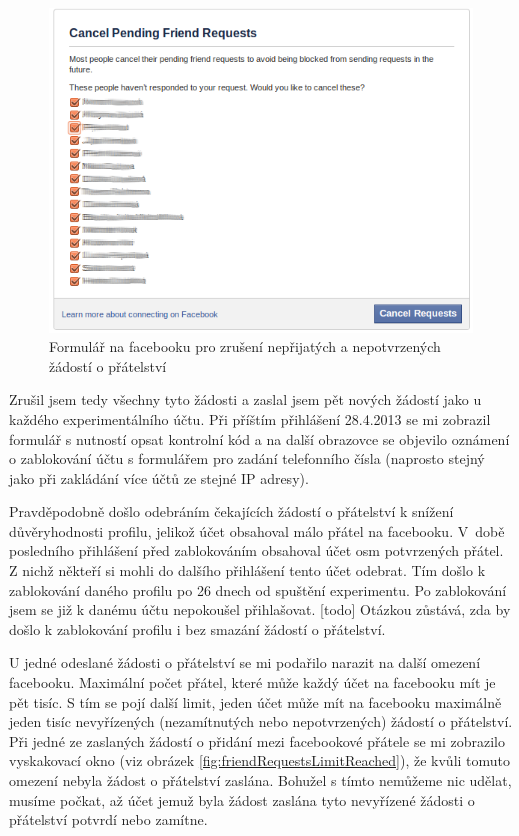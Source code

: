 \documentclass[thesis=M,czech]{FITthesis}[2013/05/10]
\begin{document}
\begin{figure}[h]
\begin{center}
\includegraphics[width=5in]{figures/cancelPendingFriendRequests.png}
\caption{Formulář na facebooku pro zrušení nepřijatých  a nepotvrzených žádostí o přátelství}
\label{fig:cancelPendingFrinedRequests}
\end{center}
\end{figure}

Zrušil jsem tedy všechny tyto žádosti a zaslal jsem pět nových žádostí jako u každého experimentálního účtu. Při příštím přihlášení 28.4.2013 se mi zobrazil formulář s nutností opsat kontrolní kód a na další obrazovce se objevilo oznámení o zablokování účtu s formulářem pro zadání telefonního čísla (naprosto stejný jako při zakládání více účtů ze stejné IP adresy).

Pravděpodobně došlo odebráním čekajících žádostí o přátelství k snížení důvěryhodnosti profilu, jelikož účet obsahoval málo přátel na facebooku. V~době posledního přihlášení před zablokováním obsahoval účet osm potvrzených přátel. Z nichž někteří si mohli do dalšího přihlášení tento účet odebrat. Tím došlo k zablokování daného profilu po 26 dnech od spuštění experimentu. Po zablokování jsem se již k danému účtu nepokoušel přihlašovat. [todo] Otázkou zůstává, zda by došlo k zablokování profilu i bez smazání žádostí o přátelství.

U jedné odeslané žádosti o přátelství se mi podařilo narazit na další omezení facebooku. Maximální počet přátel, které může každý účet na facebooku mít je pět tisíc. S tím se pojí další limit, jeden účet může mít na facebooku maximálně jeden tisíc nevyřízených (nezamítnutých nebo nepotvrzených) žádostí o přátelství. Při jedné ze zaslaných žádostí o přidání mezi facebookové přátele se mi zobrazilo vyskakovací okno (viz obrázek \ref{fig:friendRequestsLimitReached}), že kvůli tomuto omezení nebyla žádost o přátelství zaslána. Bohužel s tímto nemůžeme nic udělat, musíme počkat, až účet jemuž byla žádost zaslána tyto nevyřízené žádosti o přátelství potvrdí nebo zamítne.
\end{document}
